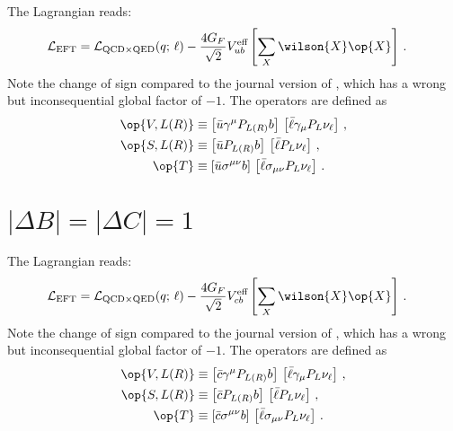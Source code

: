 The Lagrangian reads:
\begin{equation}
\begin{aligned}
  {\cal L}_\text{EFT} &
  = {\cal L}_{\text{QCD} \times \text{QED}} (q;\, \ell) - \frac{4 G_F}{\sqrt{2}} V_{ub}^\text{eff} \left[
      \sum_{X}  \wilson{X} \op{X}
    \right] \,.
\end{aligned}
\end{equation}
Note the change of sign compared to the journal version of \cite{Feldmann:2015xsa}, which has a
wrong but inconsequential global factor of $-1$. The operators are defined as
\begin{equation}
\begin{aligned}
    \op{V,L(R)}
        & \equiv \left[\bar{u} \gamma^\mu P_{L(R)} b\right]\,\left[\bar{\ell} \gamma_\mu P_L \nu_\ell\right]\,, \\
    \op{S,L(R)}
        & \equiv \left[\bar{u} P_{L(R)} b\right]\,\left[\bar{\ell} P_L \nu_\ell\right]\,, \\
    \op{T}
        & \equiv \left[\bar{u} \sigma^{\mu\nu} b\right]\,\left[\bar{\ell} \sigma_{\mu\nu} P_L \nu_\ell\right]\,.
\end{aligned}
\end{equation}


\section{$|\Delta B| = |\Delta C| = 1$}

The Lagrangian reads:
\begin{equation}
\begin{aligned}
  {\cal L}_{\rm EFT} &
  = {\cal L}_{{\rm QCD} \times {\rm QED}} (q;\, \ell) - \frac{4 G_F}{\sqrt{2}} V_{cb}^\text{eff} \left[
      \sum_{X}  \wilson{X} \op{X}
    \right] \,.
\end{aligned}
\end{equation}
Note the change of sign compared to the journal version of \cite{Feldmann:2015xsa}, which has a
wrong but inconsequential global factor of $-1$. The operators are defined as
\begin{equation}
\begin{aligned}
    \op{V,L(R)}
        & \equiv \left[\bar{c} \gamma^\mu P_{L(R)} b\right]\,\left[\bar{\ell} \gamma_\mu P_L \nu_\ell\right]\,, \\
    \op{S,L(R)}
        & \equiv \left[\bar{c} P_{L(R)} b\right]\,\left[\bar{\ell} P_L \nu_\ell\right]\,, \\
    \op{T}
        & \equiv \left[\bar{c} \sigma^{\mu\nu} b\right]\,\left[\bar{\ell} \sigma_{\mu\nu} P_L \nu_\ell\right]\,.
\end{aligned}
\end{equation}

